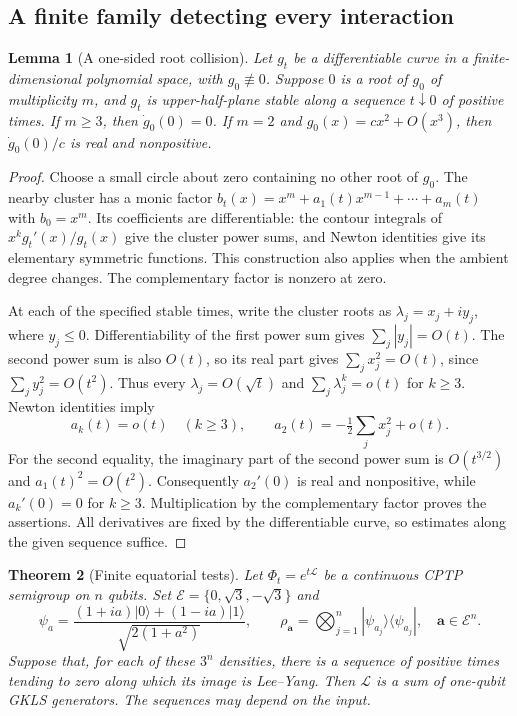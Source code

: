\documentclass[reqno]{amsart}
\newtheorem{theorem}{Theorem}[section]
\newtheorem{lemma}[theorem]{Lemma}
\theoremstyle{definition}
\theoremstyle{remark}
\begin{document}
\subsection{A finite family detecting every interaction}

\begin{lemma}[A one-sided root collision]\label{dyn:collision}
Let $g_t$ be a differentiable curve in a finite-dimensional polynomial space,
with $g_0\not\equiv0$.  Suppose $0$ is a root of $g_0$ of multiplicity $m$,
and $g_t$ is upper-half-plane stable along a sequence $t\downarrow0$ of
positive times.  If $m\ge3$, then $\dot g_0(0)=0$.  If $m=2$ and
$g_0(x)=c x^2+O(x^3)$, then $\dot g_0(0)/c$ is real and nonpositive.
\end{lemma}

\begin{proof}
Choose a small circle about zero containing no other root of $g_0$.
The nearby cluster has a monic factor
$b_t(x)=x^m+a_1(t)x^{m-1}+\cdots+a_m(t)$ with $b_0=x^m$.
Its coefficients are differentiable: the contour integrals of
$x^k g_t'(x)/g_t(x)$ give the cluster power sums, and Newton identities give
its elementary symmetric functions.  This construction also applies when
the ambient degree changes.  The complementary factor is nonzero at zero.

At each of the specified stable times, write the cluster roots as
$\lambda_j=x_j+i y_j$, where $y_j\le0$.  Differentiability of the first
power sum gives $\sum_j|y_j|=O(t)$.  The second power sum is also $O(t)$,
so its real part gives $\sum_jx_j^2=O(t)$, since
$\sum_j y_j^2=O(t^2)$.  Thus every $\lambda_j=O(\sqrt t)$ and
$\sum_j\lambda_j^k=o(t)$ for $k\ge3$.  Newton identities imply
\[
 a_k(t)=o(t)\quad(k\ge3),\qquad
 a_2(t)=-\tfrac12\sum_jx_j^2+o(t).
\]
For the second equality, the imaginary part of the second power sum is
$O(t^{3/2})$ and $a_1(t)^2=O(t^2)$.  Consequently $a_2'(0)$ is real and
nonpositive, while $a_k'(0)=0$ for $k\ge3$.  Multiplication by the
complementary factor proves the assertions.  All derivatives are fixed by
the differentiable curve, so estimates along the given sequence suffice.
\end{proof}

\begin{theorem}[Finite equatorial tests]\label{dyn:trine}
Let $\Phi_t=e^{t\mathcal L}$ be a continuous CPTP semigroup on $n$ qubits.
Set $\mathcal E=\{0,\sqrt3,-\sqrt3\}$ and
\[
 \psi_a=\frac{(1+ia)|0\rangle+(1-ia)|1\rangle}
 {\sqrt{2(1+a^2)}},\qquad
 \rho_{\boldsymbol a}=\bigotimes_{j=1}^n
 |\psi_{a_j}\rangle\langle\psi_{a_j}|,\quad
 \boldsymbol a\in\mathcal E^n.
\]
Suppose that, for each of these $3^n$ densities, there is a sequence of
positive times tending to zero along which its image is Lee--Yang.
Then $\mathcal L$ is a sum of one-qubit GKLS generators.
The sequences may depend on the input.
\end{theorem}
\end{document}
